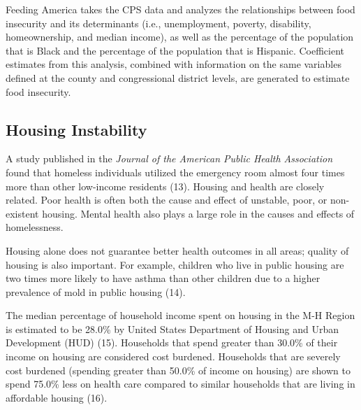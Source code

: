 \documentclass[
  english,
  letterpaper,
]{report}
\begin{document}
\begin{tcolorbox}[enhanced jigsaw, breakable, leftrule=.75mm, title=\textcolor{quarto-callout-note-color}{\faInfo}\hspace{0.5em}{Note}, bottomrule=.15mm, opacityback=0, left=2mm, colback=white, bottomtitle=1mm, coltitle=black, colbacktitle=quarto-callout-note-color!10!white, colframe=quarto-callout-note-color-frame, opacitybacktitle=0.6, toptitle=1mm, titlerule=0mm, arc=.35mm, rightrule=.15mm, toprule=.15mm]

Feeding America takes the CPS data and analyzes the relationships
between food insecurity and its determinants (i.e., unemployment,
poverty, disability, homeownership, and median income), as well as the
percentage of the population that is Black and the percentage of the
population that is Hispanic. Coefficient estimates from this analysis,
combined with information on the same variables defined at the county
and congressional district levels, are generated to estimate food
insecurity.

\end{tcolorbox}

\subsection{Housing Instability}\label{housing-instability}

A study published in the \emph{Journal of the American Public Health
Association} found that homeless individuals utilized the emergency room
almost four times more than other low-income residents (13). Housing and
health are closely related. Poor health is often both the cause and
effect of unstable, poor, or non-existent housing. Mental health also
plays a large role in the causes and effects of homelessness.

Housing alone does not guarantee better health outcomes in all areas;
quality of housing is also important. For example, children who live in
public housing are two times more likely to have asthma than other
children due to a higher prevalence of mold in public housing (14).

The median percentage of household income spent on housing in the M-H
Region is estimated to be 28.0\% by United States Department of Housing
and Urban Development (HUD) (15). Households that spend greater than
30.0\% of their income on housing are considered cost burdened.
Households that are severely cost burdened (spending greater than 50.0\%
of income on housing) are shown to spend 75.0\% less on health care
compared to similar households that are living in affordable housing
(16).
\end{document}
